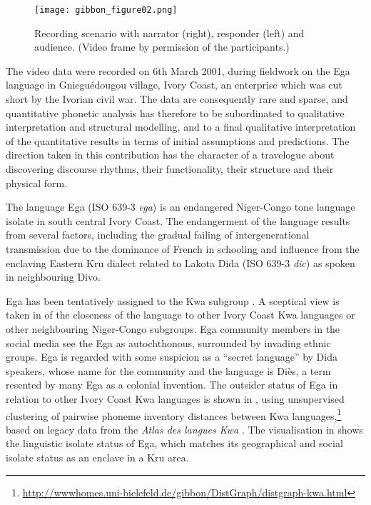 \documentclass[output=paper,colorlinks,citecolor=brown]{langscibook}
\begin{document}
\begin{figure}
\texttt{[image: gibbon\_figure02.png]}
\caption{\label{fig:fig02}Recording scenario with narrator (right), responder (left) and audience. (Video frame by permission of the participants.)}
\end{figure}

The video data were recorded on 6th March 2001, during fieldwork on the Ega language in Gnieguédougou village, Ivory Coast, an enterprise which was cut short by the Ivorian civil war. The data are consequently rare and sparse, and quantitative phonetic analysis has therefore to be subordinated to qualitative interpretation and structural modelling, and to a final qualitative interpretation of the quantitative results in terms of initial assumptions and predictions. The direction taken in this contribution has the character of a travelogue about discovering discourse rhythms, their functionality, their structure and their physical form.

The language Ega (ISO 639-3 \textit{ega}) is an endangered Niger-Congo tone language isolate in south central Ivory Coast. The endangerment of the language results from several factors, including the gradual failing of intergenerational transmission due to the dominance of French in schooling and influence from the enclaving Eastern Kru dialect related to Lakota Dida (ISO 639-3 \textit{dic}) as spoken in neighbouring Divo.

Ega has been tentatively assigned to the Kwa subgroup \citep{bolerichard1983, connellahouagibbon2002, salffner2004}. A sceptical view is taken in  of the closeness of the language to other Ivory Coast Kwa languages or other neighbouring Niger-Congo subgroups. Ega community members in the social media see the Ega as autochthonous, surrounded by invading ethnic groups. Ega is regarded with some suspicion as a “secret language” by Dida speakers, whose name for the community and the language is Diès, a term resented by many Ega as a colonial invention. The outsider status of Ega in relation to other Ivory Coast Kwa languages is shown in , using unsupervised clustering of pairwise phoneme inventory distances between Kwa languages,\footnote{\url{http://wwwhomes.uni-bielefeld.de/gibbon/DistGraph/distgraph-kwa.html}} based on legacy data from the \textit{Atlas des langues Kwa} \citep{herault1983}. The visualisation in  shows the linguistic isolate status of Ega, which matches its geographical and social isolate status as an enclave in a Kru area.
\end{document}
